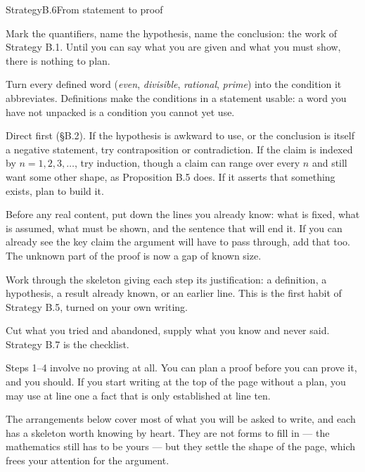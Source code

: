\documentclass[a4paper,12pt,oneside]{memoir}
\begin{document}
\begin{envstrategy}{Strategy}{B.6}{From statement to proof}
\begin{steps}
  \item {} Mark the quantifiers, name the hypothesis, name the conclusion: the work of Strategy B.1. Until you can say what you are given and what you must show, there is nothing to plan.
  \item {} Turn every defined word (\emph{even}, \emph{divisible}, \emph{rational}, \emph{prime}) into the condition it abbreviates. Definitions make the conditions in a statement usable: a word you have not unpacked is a condition you cannot yet use.
  \item {} Direct first (§B.2). If the hypothesis is awkward to use, or the conclusion is itself a negative statement, try contraposition or contradiction. If the claim is indexed by \(n = 1, 2, 3, \ldots\), try induction, though a claim can range over every \(n\) and still want some other shape, as Proposition B.5 does. If it asserts that something exists, plan to build it.
  \item {} Before any real content, put down the lines you already know: what is fixed, what is assumed, what must be shown, and the sentence that will end it. If you can already see the key claim the argument will have to pass through, add that too. The unknown part of the proof is now a gap of known size.
  \item {} Work through the skeleton giving each step its justification: a definition, a hypothesis, a result already known, or an earlier line. This is the first habit of Strategy B.5, turned on your own writing.
  \item {} Cut what you tried and abandoned, supply what you know and never said. Strategy B.7 is the checklist.
\end{steps}
\begin{informal}
Steps 1–4 involve no proving at all. You can plan a proof before you can prove it, and you should. If you start writing at the top of the page without a plan, you may use at line one a fact that is only established at line ten.
\end{informal}
\end{envstrategy}
The arrangements below cover most of what you will be asked to write, and each has a skeleton worth knowing by heart. They are not forms to fill in — the mathematics still has to be yours — but they settle the shape of the page, which frees your attention for the argument.
\end{document}
